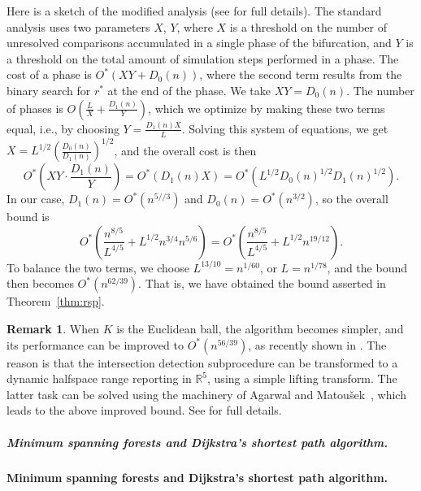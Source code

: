 \documentclass[11pt]{article}
\def\reals{{\mathbb R}}
\def\K{\mathcal{K}}
\newtheorem{theorem}{Theorem}[section]
\theoremstyle{definition}
\newtheorem{remark}{Remark}
\begin{document}
Here is a sketch of the modified analysis (see \cite{BFKKS,KKSS} for full details). 
The standard analysis uses two parameters $X$, $Y$, where $X$ is a threshold on the 
number of unresolved comparisons accumulated in a single phase of the bifurcation, 
and $Y$ is a threshold
on the total amount of simulation steps performed in a phase. The cost of a phase is
$O^*(XY + D_0(n))$, where the second term results from the binary search for $r^*$ at the 
end of the phase. We take $XY = D_0(n)$. The number of phases is 
${\displaystyle O\left( \frac{L}{X} + \frac{D_1(n)}{Y} \right)}$, which we optimize by making 
these two terms equal, i.e., by choosing ${\displaystyle Y = \frac{D_1(n)X}{L}}$. Solving this 
system of equations, we get ${\displaystyle X = L^{1/2}\left( \frac{D_0(n)}{D_1(n)}\right)^{1/2}}$, 
and the overall cost is then
\[
O^*\left( XY\cdot \frac{D_1(n)}{Y} \right) = O^*(D_1(n)X) = O^*(L^{1/2}D_0(n)^{1/2}D_1(n)^{1/2}) .
\]
In our case, $D_1(n) = O^*(n^{5//3})$ and $D_0(n) = O^*(n^{3/2})$, so the overall bound is
\[
O^*\left( \frac{n^{8/5}}{L^{4/5}} + L^{1/2}n^{3/4}n^{5/6} \right) =
O^*\left( \frac{n^{8/5}}{L^{4/5}} + L^{1/2}n^{19/12} \right) .
\]
To balance the two terms, we choose $L^{13/10} = n^{1/60}$, or $L = n^{1/78}$, and the bound then becomes
$O^*\left(n^{62/39} \right)$. That is, we have obtained the bound asserted in Theorem~\ref{thm:rsp}.

\medskip
\begin{remark}
When $K$ is the Euclidean ball, the algorithm becomes simpler, and its performance can be
improved to $O^*(n^{56/39})$, as recently shown in \cite{KSS}. The reason is that the intersection
detection subprocedure can be transformed to a dynamic halfspace range reporting in $\reals^5$,
using a simple lifting transform. The latter task can be solved using the machinery of Agarwal and
Matou\v{s}ek~\cite{AM95}, which leads to the above improved bound. See \cite{KSS} for full details.
\end{remark}

\ifsocgproc
\subparagraph*{Minimum spanning forests and Dijkstra's shortest path algorithm.}
\else
\paragraph{Minimum spanning forests and Dijkstra's shortest path algorithm.}
\fi
\end{document}
